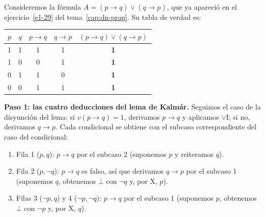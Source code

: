 \begin{example}\label{ej:kalmar-linealidad}
Consideremos la fórmula $A = (p \to q) \lor (q \to p)$, que ya apareció en el ejercicio~\ref{e1-29} del tema~\ref{cap:dn-prop}. Su tabla de verdad es:
\begin{center}
\begin{tabular}{cc|c|c|c}
$p$ & $q$ & $p \to q$ & $q \to p$ & $(p \to q) \lor (q \to p)$ \\
\hline
1 & 1 & 1 & 1 & \textbf{1} \\
1 & 0 & 0 & 1 & \textbf{1} \\
0 & 1 & 1 & 0 & \textbf{1} \\
0 & 0 & 1 & 1 & \textbf{1}
\end{tabular}
\end{center}

\textbf{Paso 1: las cuatro deducciones del lema de Kalmár.} Seguimos el caso de la disyunción del lema: si $v(p \to q) = 1$, derivamos $p \to q$ y aplicamos $\lor$I; si no, derivamos $q \to p$. Cada condicional se obtiene con el subcaso correspondiente del caso del condicional:
\begin{enumerate}
    \item Fila 1 ($p, q$): $p \to q$ por el subcaso 2 (suponemos $p$ y reiteramos $q$).
    \item Fila 2 ($p, \neg q$): $p \to q$ es falso, así que derivamos $q \to p$ por el subcaso 1 (suponemos $q$, obtenemos $\bot$ con $\neg q$ y, por X, $p$).
    \item Filas 3 ($\neg p, q$) y 4 ($\neg p, \neg q$): $p \to q$ por el subcaso 1 (suponemos $p$, obtenemos $\bot$ con $\neg p$ y, por X, $q$).
\end{enumerate}


\end{example}
